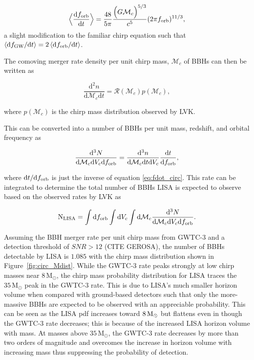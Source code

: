 \documentclass[twocolumn]{aastex631}
\begin{document}
\begin{equation}
    \Big\langle\frac{\mathrm{d}f_{\rm orb}}{\mathrm{d}t}\Big\rangle = \frac{48}{5 \pi} \frac{\Big(G \mathcal{M}_c \Big)^{5/3}}{c^5} (2 \pi f_{\rm orb})^{11/3}, 
    \label{eq:fdot_circ}
\end{equation}
\noindent a slight modification to the familiar chirp equation such that $\langle\mathrm{d}f_{\rm GW}/\mathrm{d}t\rangle = 2\,\langle\mathrm{d}f_{\rm orb}/\mathrm{d}t\rangle$. 

The comoving merger rate density per unit chirp mass, $\mathcal{M}_c$ of BBHs can then be written as

\begin{equation}
    \frac{\mathrm{d}^2n}{\mathrm{d}\mathcal{M}_c \mathrm{d}t} = \mathcal{R}(\mathcal{M}_c) p(\mathcal{M}_c),
    \label{eq:merger_rate_density}
\end{equation}

\noindent where $p(\mathcal{M}_c)$ is the chirp mass distribution observed by LVK. 

This can be converted into a number of BBHs per unit mass, redshift, and orbital frequency as

\begin{equation}
    \frac{\mathrm{d}^3N}{\mathrm{d}\mathcal{M}_c \mathrm{d}V_c \mathrm{d}f_{\rm orb}} = \frac{\mathrm{d}^3n}{\mathrm{d}\mathcal{M}_c \mathrm{d}t \mathrm{d}V_c} \frac{\mathrm{d}t}{\mathrm{d}f_{\rm orb}},
    \label{eq:rate_per_freq}
\end{equation}

where $\mathrm{d}t / \mathrm{d}f_{\rm orb}$ is just the inverse of equation \ref{eq:fdot_circ}. This rate can be integrated to determine the total number of BBHs LISA is expected to observe based on the observed rates by LVK as 

\begin{equation}
    \mathrm{N_{LISA}} = \int\mathrm{d}f_{\rm orb} \int\mathrm{d}V_{c} \int\mathrm{d}\mathcal{M}_c \frac{\mathrm{d}^3N}{\mathrm{d}\mathcal{M}_c \mathrm{d}V_c \mathrm{d}f_{\rm orb}}.
\end{equation}

Assuming the BBH merger rate per unit chirp mass from GWTC-3 and a detection threshold of $SNR > 12$ (CITE GEROSA), the number of BBHs detectable by LISA is $1.085$ with the chirp mass distribution shown in Figure~\ref{fig:circ_Mdist}. While the GWTC-3 rate peaks strongly at low chirp masses near $8\,\mathrm{M_{\odot}}$, the chirp mass probability distribution for LISA traces the $35\,\mathrm{M_{\odot}}$ peak in the GWTC-3 rate. This is due to LISA's much smaller horizon volume when compared with ground-based detectors such that only the more-massive BBHs are expected to be observed with an appreciable probability. This can be seen as the LISA pdf increases toward $8\,\rm{M_{\odot}}$ but flattens even in though the GWTC-3 rate decreases; this is because of the increased LISA horizon volume with mass. At masses above $35\,\mathrm{M_{\odot}}$, the GWTC-3 rate decreases by more than two orders of magnitude and overcomes the increase in horizon volume with increasing mass thus suppressing the probability of detection.
\end{document}
